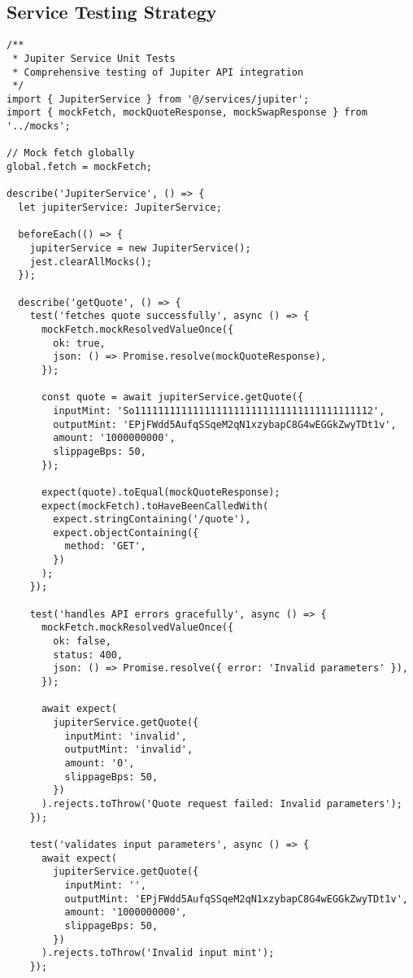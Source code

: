 \documentclass[11pt,a4paper]{article}
\begin{document}
\subsection{Service Testing Strategy}

\begin{lstlisting}[style=typescript, caption=Service Layer Unit Tests]
/**
 * Jupiter Service Unit Tests
 * Comprehensive testing of Jupiter API integration
 */
import { JupiterService } from '@/services/jupiter';
import { mockFetch, mockQuoteResponse, mockSwapResponse } from '../mocks';

// Mock fetch globally
global.fetch = mockFetch;

describe('JupiterService', () => {
  let jupiterService: JupiterService;

  beforeEach(() => {
    jupiterService = new JupiterService();
    jest.clearAllMocks();
  });

  describe('getQuote', () => {
    test('fetches quote successfully', async () => {
      mockFetch.mockResolvedValueOnce({
        ok: true,
        json: () => Promise.resolve(mockQuoteResponse),
      });

      const quote = await jupiterService.getQuote({
        inputMint: 'So11111111111111111111111111111111111111112',
        outputMint: 'EPjFWdd5AufqSSqeM2qN1xzybapC8G4wEGGkZwyTDt1v',
        amount: '1000000000',
        slippageBps: 50,
      });

      expect(quote).toEqual(mockQuoteResponse);
      expect(mockFetch).toHaveBeenCalledWith(
        expect.stringContaining('/quote'),
        expect.objectContaining({
          method: 'GET',
        })
      );
    });

    test('handles API errors gracefully', async () => {
      mockFetch.mockResolvedValueOnce({
        ok: false,
        status: 400,
        json: () => Promise.resolve({ error: 'Invalid parameters' }),
      });

      await expect(
        jupiterService.getQuote({
          inputMint: 'invalid',
          outputMint: 'invalid',
          amount: '0',
          slippageBps: 50,
        })
      ).rejects.toThrow('Quote request failed: Invalid parameters');
    });

    test('validates input parameters', async () => {
      await expect(
        jupiterService.getQuote({
          inputMint: '',
          outputMint: 'EPjFWdd5AufqSSqeM2qN1xzybapC8G4wEGGkZwyTDt1v',
          amount: '1000000000',
          slippageBps: 50,
        })
      ).rejects.toThrow('Invalid input mint');
    });


\end{lstlisting}
\end{document}
